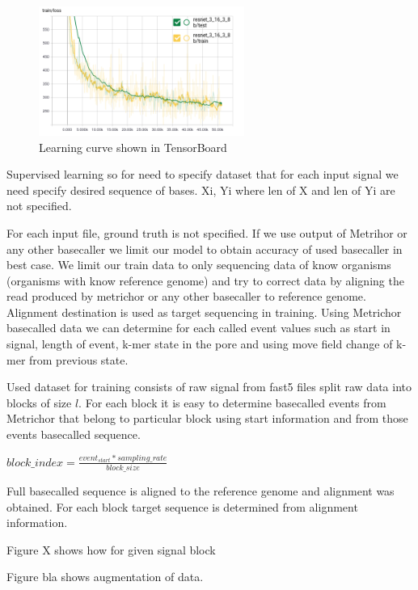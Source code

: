 \documentclass[times, utf8, diplomski, numeric, english]{fer}
\begin{document}
 

\begin{figure}[!ht]
	\begin{center}
		\includegraphics[width=0.6\textwidth]{./imgs/train_tb.png}
		\caption{Learning curve shown in TensorBoard}
		\label{fg:learn}
	\end{center}
\end{figure}


Supervised learning so for need to specify dataset that for each input signal we need specify desired sequence of bases.
{Xi, Yi} where len of X and len of Yi are not specified.

For each input file, ground truth is not specified. If we use output of Metrihor or any other basecaller we limit our model to
obtain accuracy of used basecaller in best case. We limit our train data to only sequencing data of know organisms (organisms with know reference genome) and try to correct data by aligning the read produced by metrichor or any other basecaller to reference genome. Alignment destination is used as target sequencing in training. 
Using Metrichor basecalled data we can determine for each called event values such as start in signal, length of event, k-mer state in the pore and using move field change of k-mer from previous state. 

Used dataset for training consists of raw signal from fast5 files split raw data into blocks of size $l$.
For each block it is easy to determine basecalled events from Metrichor that belong to particular block using start information and from those events basecalled sequence. 


$block\_index =  \frac{event_{start} * sampling\_rate}{block\_size}$

Full basecalled sequence is aligned to the reference genome and alignment was obtained. For each block target sequence is determined from alignment information.

Figure X shows how for given signal block


Figure bla shows augmentation of data.
\end{document}
